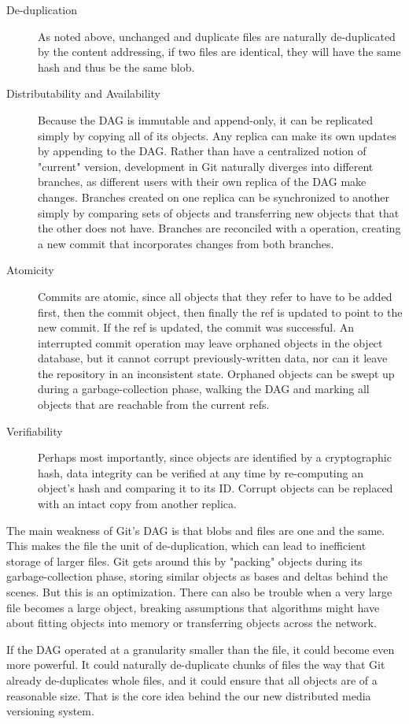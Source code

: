 \begin{description}

    \item[De-duplication] As noted above, unchanged and duplicate files are
        naturally de-duplicated by the content addressing, if two files are
        identical, they will have the same hash and thus be the same blob.

    \item[Distributability and Availability] Because the DAG is immutable and
        append-only, it can be replicated simply by copying all of its objects.
        Any replica can make its own updates by appending to the DAG. Rather
        than have a centralized notion of "current" version, development in Git
        naturally diverges into different branches, as different users with
        their own replica of the DAG make changes. Branches created on one
        replica can be synchronized to another simply by comparing sets of
        objects and transferring new objects that that the other does not have.
        Branches are reconciled with a  operation, creating a new
        commit that incorporates changes from both branches.

    \item[Atomicity] Commits are atomic, since all objects that they refer to
        have to be added first, then the commit object, then finally the ref is
        updated to point to the new commit. If the ref is updated, the commit
        was successful. An interrupted commit operation may leave orphaned
        objects in the object database, but it cannot corrupt previously-written
        data, nor can it leave the repository in an inconsistent state. Orphaned
        objects can be swept up during a garbage-collection phase, walking the
        DAG and marking all objects that are reachable from the current refs.

    \item[Verifiability] Perhaps most importantly, since objects are identified
        by a cryptographic hash, data integrity can be verified at any time by
        re-computing an object's hash and comparing it to its ID. Corrupt
        objects can be replaced with an intact copy from another replica.

\end{description}

The main weakness of Git's DAG is that blobs and files are one and the same.
This makes the file the unit of de-duplication, which can lead to inefficient
storage of larger files. Git gets around this by "packing" objects during its
garbage-collection phase, storing similar objects as bases and deltas behind the
scenes. But this is an optimization. There can also be trouble when a very large
file becomes a large object, breaking assumptions that algorithms might have
about fitting objects into memory or transferring objects across the network.

If the DAG operated at a granularity smaller than the file, it could become even
more powerful. It could naturally de-duplicate chunks of files the way that Git
already de-duplicates whole files, and it could ensure that all objects are of a
reasonable size. That is the core idea behind the our new distributed media
versioning system.
